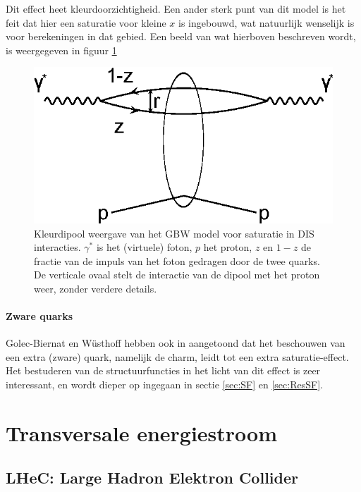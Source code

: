 \documentclass[a4paper,11pt]{article}
\numberwithin{equation}{section} %
\begin{document}
Dit effect heet kleurdoorzichtigheid.
Een ander sterk punt van dit model is het feit dat hier een saturatie voor kleine $x$ is ingebouwd, wat natuurlijk wenselijk is voor berekeningen in dat gebied.
Een beeld van wat hierboven beschreven wordt, is weergegeven in figuur \ref{fig:GBW}
\begin{figure} [H]
  \begin{center}
    \includegraphics[width=.66\textwidth]{Afbeeldingen/GBW.eps}
    \caption{Kleurdipool weergave van het GBW model voor saturatie in DIS interacties. $\gamma^*$ is het (virtuele) foton, $p$ het proton, $z$ en $1-z$ de fractie van de impuls van het foton gedragen door de twee quarks. De verticale ovaal stelt de interactie van de dipool met het proton weer, zonder verdere details. \cite{ET}}
   \label{fig:GBW}
  \end{center}
\end{figure}

      \paragraph{Zware quarks}
Golec-Biernat en Wüsthoff hebben ook in \cite{GBW} aangetoond dat het beschouwen van een extra (zware) quark, namelijk de charm, leidt tot een extra saturatie-effect.
Het bestuderen van de structuurfuncties in het licht van dit effect is zeer interessant, en wordt dieper op ingegaan in sectie \ref{sec:SF} en \ref{sec:ResSF}.

\section{Transversale energiestroom}
  \subsection{LHeC: Large Hadron Elektron Collider}
\end{document}

